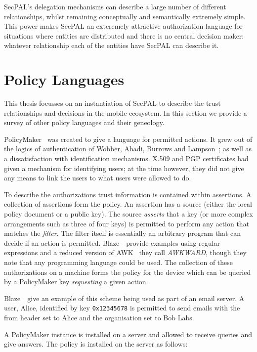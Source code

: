 \documentclass[thesis.tex]{subfiles}
\begin{document}
SecPAL's delegation mechanisms can describe a large number of
different relationships, whilst remaining conceptually and
semantically extremely simple.  This power makes SecPAL an exteremely
attractive authorization language for situations where entities are
distributed and there is no central decision maker: whatever
relationship each of the entities have SecPAL can describe it.

\section{Policy Languages}

This thesis focusses on an instantiation of SecPAL to describe the trust
relationships and decisions in the mobile ecosystem. In this section we provide
a survey of other policy languages and their geneology.

PolicyMaker~\cite{blaze_decentralized_1996} was created to give a language for
permitted actions. It grew out of the logics of authentication of Wobber, Abadi,
Burrows and Lampson~\cite{wobber_authentication_1994,abadi_calculus_1991}; as
well as a dissatisfaction with identification mechanisms. X.509 and PGP
certificates had given a mechanism for identifying users; at the time however,
they did not give any means to link the users to what users were allowed to do.

To describe the authorizations trust information is contained within assertions.
A collection of assertions form the policy. An assertion has a source (either
the local policy document or a public key). The source \emph{asserts} that a key
(or more complex arrangements such as three of four keys) is permitted to
perform any action that matches the \emph{filter}. The filter itself is
essentially an arbitrary program that can decide if an action is permitted.
Blaze~\etal~provide examples using regular expressions and a reduced version of
AWK~\cite{aho_awk-pattern_1979} they call \emph{AWKWARD}, though they note that
any programming language could be used. The collection of these authorizations
on a machine forms the policy for the device which can be queried by a
PolicyMaker key \emph{requesting} a given action.

Blaze~\etal~give an example of this scheme being used as part of an email
server. A user, Alice, identified by key \texttt{0x12345678} is permitted to
send emails with the from header set to Alice and the organisation set to Bob
Labs.

A PolicyMaker instance is installed on a server and allowed to receive queries and give answers.
The policy is installed on the server as follows:
\end{document}

